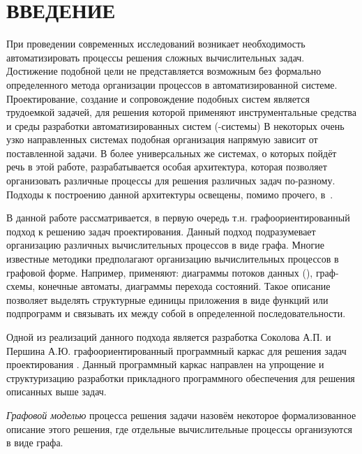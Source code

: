 \chapter*{ВВЕДЕНИЕ}\label{chap.introduction}

При проведении современных исследований возникает необходимость автоматизировать процессы решения сложных вычислительных задач. Достижение подобной цели не представляется возможным без формально определенного метода организации процессов в автоматизированной системе. Проектирование, создание и сопровождение подобных систем является трудоемкой задачей, для решения которой применяют инструментальные средства и среды разработки автоматизированных систем (-системы)\cite{Golubev2020} В некоторых очень узко направленных системах подобная организация напрямую зависит от поставленной задачи. В более универсальных же системах, о которых пойдёт речь в этой работе, разрабатывается особая архитектура, которая позволяет организовать различные процессы для решения различных задач по-разному. Подходы к построению данной архитектуры освещены, помимо прочего, в~\cite{SokolovCADCMConcept2020}.

В данной работе рассматривается, в первую очередь т.н. графоориентированный подход к решению задач проектирования. Данный подход подразумевает организацию различных вычислительных процессов в виде графа. Многие известные методики предполагают организацию вычислительных процессов в графовой форме. Например, применяют: диаграммы потоков данных (), граф-схемы, конечные автоматы, диаграммы перехода состояний. Такое описание позволяет выделять структурные единицы приложения в виде функций или подпрограмм и связывать их между собой в определенной последовательности\cite{SokolovGolubev2021}.

Одной из реализаций данного подхода является разработка Соколова А.П. и Першина А.Ю. графоориентированный программный каркас для решения задач проектирования . Данный программный каркас направлен на упрощение и структуризацию разработки прикладного программного обеспечения для решения описанных выше задач.

\begin{definition}
    \emph{Графовой моделью} процесса решения задачи назовём некоторое формализованное описание этого решения, где отдельные вычислительные процессы организуются в виде графа.
\end{definition}

